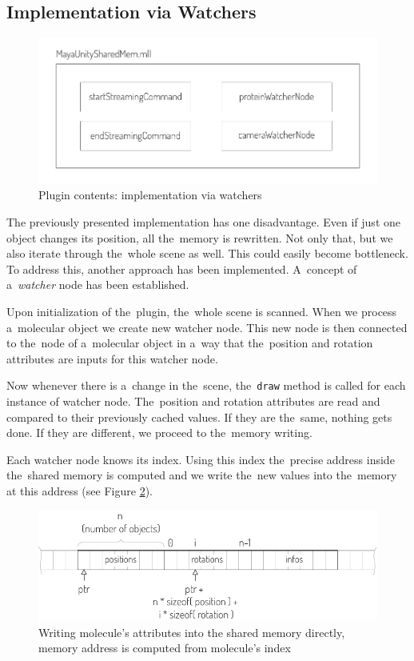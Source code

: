 \documentclass[
  digital, %
  table,   %
  nolof,     %
  nolot,     %
  oneside,
]{fithesis3}
\begin{document}
\subsection{Implementation via Watchers}
\begin{figure}
  \centering
  \includegraphics[scale=0.8]{images/plugin-contents-watchers.pdf}
  \caption{Plugin contents: implementation via watchers}
  \label{fig:plugin-content-watchers}
\end{figure}

The previously presented implementation has one disadvantage. Even if just one object changes its position, all the memory is rewritten. Not only that, but we also iterate through the whole scene as well. This could easily become bottleneck. To address this, another approach has been implemented. A concept of a \textit{watcher} node has been established.

Upon initialization of the plugin, the whole scene is scanned. When we process a molecular object we create new watcher node. This new node is then connected to the node of a molecular object in a way that the position and rotation attributes are inputs for this watcher node.

Now whenever there is a change in the scene, the \texttt{draw} method is called for each instance of watcher node. The position and rotation attributes are read and compared to their previously cached values. If they are the same, nothing gets done. If they are different, we proceed to the memory writing.

Each watcher node knows its index. Using this index the precise address inside the shared memory is computed and we write the new values into the memory at this address (see Figure \ref{fig:direct-writing}).

\begin{figure}
  \centering
  \includegraphics[scale=1.0]{images/direct-writing.pdf}
  \caption{Writing molecule's attributes into the shared memory directly, memory address is computed from molecule's index}
  \label{fig:direct-writing}
\end{figure}
\end{document}

